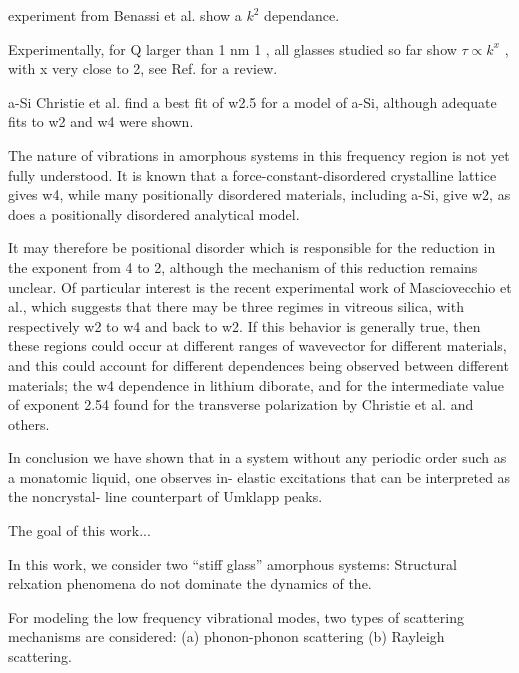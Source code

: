 \documentclass[aps,prb,twocolumn,superscriptaddress,footinbib,amsmath,amssymb,floatfix]{revtex4}
\begin{document}
experiment from Benassi et al. show a $k^2$ 
dependance.\cite{benassi_evidence_1996}

Experimentally, for Q larger
than 1 nm 1 , all glasses studied so far show $\tau \propto k^x$ , with x
very close to 2, see Ref.  for a review. 

a-Si
Christie et al. find a best fit of w2.5 for a model of a-Si, although 
adequate fits to w2 and w4 were shown.\cite{christie_vibrational_2007} 

The nature of vibrations in amorphous systems in this
frequency region is not yet fully understood. It is known
that a force-constant-disordered crystalline lattice gives 
w4,\cite{schirmacher_harmonic_1998,taraskin_origin_2001} 
while many positionally disordered materials, including a-Si, 
give w2, as does a positionally disordered analytical model.
\cite{martin-mayor_dynamical_2001,ciliberti_brillouin_2003} 

It may therefore be positional disorder which is responsible 
for the reduction
in the exponent from 4 to 2, although the mechanism of
this reduction remains unclear. Of particular interest is
the recent experimental work of Masciovecchio et al.,
\cite{masciovecchio_evidence_2006}
which suggests that there may be three regimes in vitreous
silica, with respectively w2 to w4 and back to w2. If this
behavior is generally true, then these regions could occur
at different ranges of wavevector for different materials,
and this could account for different dependences being
observed between different materials; the w4 dependence in 
lithium diborate,\cite{ruffle_observation_2003} and for 
the intermediate value
of exponent 2.54 found for the transverse polarization
by Christie et al.\cite{christie_vibrational_2007} and others.

In conclusion we have shown that in a system without any
periodic order such as a monatomic liquid, one observes in-
elastic excitations that can be interpreted as the noncrystal-
line counterpart of Umklapp peaks.\cite{scopigno_observation_2001} 


The goal of this work...

In this work, we consider two ``stiff glass'' amorphous systems:
Structural relxation phenomena do not dominate the dynamics 
of the.\cite{gotze_evolution_2000} 

For modeling the low frequency vibrational modes, two types of 
scattering mechanisms are considered: (a) phonon-phonon 
scattering (b) Rayleigh scattering.
\end{document}
